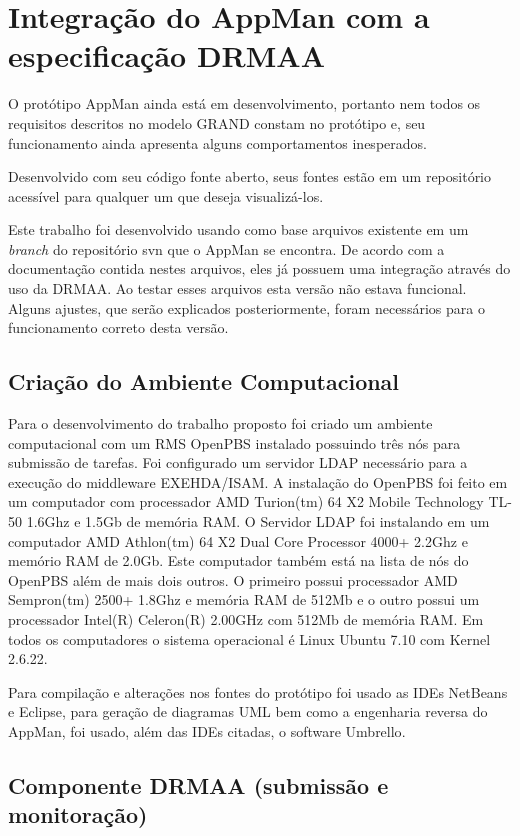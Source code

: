 \chapter{Integração do AppMan com a especificação DRMAA}
\label{cap:implementacao}

O protótipo AppMan ainda está em desenvolvimento, portanto nem todos os requisitos descritos no modelo GRAND constam no protótipo e, seu funcionamento ainda apresenta alguns comportamentos inesperados. 

Desenvolvido com seu código fonte aberto, seus fontes estão em um repositório acessível para qualquer um que deseja visualizá-los.

Este trabalho foi desenvolvido usando como base arquivos existente em um \emph{branch} do repositório svn que o AppMan se encontra. De acordo com a documentação contida nestes arquivos, eles já possuem uma integração através do uso da DRMAA. Ao testar esses arquivos esta versão não estava funcional. Alguns ajustes, que serão explicados posteriormente, foram necessários para o funcionamento correto desta versão.

\section{Criação do Ambiente Computacional}

Para o desenvolvimento do trabalho proposto foi criado um ambiente computacional com um RMS OpenPBS instalado possuindo três nós para submissão de tarefas. Foi configurado um servidor LDAP necessário para a execução do middleware EXEHDA/ISAM. A instalação do OpenPBS foi feito em um computador com processador AMD Turion(tm) 64 X2 Mobile Technology TL-50 1.6Ghz e 1.5Gb de memória RAM. O Servidor LDAP foi instalando em um computador AMD Athlon(tm) 64 X2 Dual Core Processor 4000+ 2.2Ghz e memório RAM de 2.0Gb. Este computador também está na lista de nós do OpenPBS além de mais dois outros. O primeiro possui processador AMD Sempron(tm) 2500+ 1.8Ghz e memória RAM de 512Mb e o outro possui um processador Intel(R) Celeron(R) 2.00GHz com 512Mb de memória RAM. Em todos os computadores o sistema operacional é Linux Ubuntu 7.10 com Kernel 2.6.22.

Para compilação e alterações nos fontes do protótipo foi usado as IDEs NetBeans\cite{netbeans} e Eclipse\cite{eclipse}, para geração de diagramas UML bem como a engenharia reversa do AppMan, foi usado, além das IDEs citadas, o software Umbrello\cite{umbrello}.

\section{Componente DRMAA (submissão e monitoração)}

